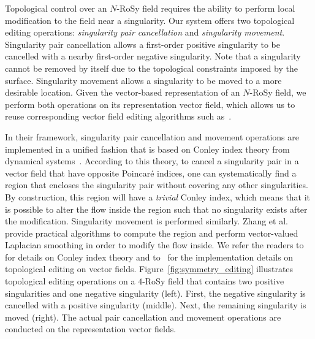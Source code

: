 \documentclass{acmsiggraph}               %
\begin{document}
%

Topological control over an $N$-RoSy field requires the ability to
perform local modification to the field near a singularity. Our
system offers two topological editing operations: {\em singularity
pair cancellation} and {\em singularity movement}. Singularity pair
cancellation allows a first-order positive singularity to be
cancelled with a nearby first-order negative singularity. Note that
a singularity cannot be removed by itself due to the topological
constraints imposed by the surface. Singularity movement allows a
singularity to be moved to a more desirable location. Given the
vector-based representation of an $N$-RoSy field, we perform both
operations on its representation vector field, which allows us to
reuse corresponding vector field editing algorithms such
as~\cite{Zhang:06}.

In their framework, singularity pair cancellation and movement
operations are implemented in a unified fashion that is based on
Conley index theory from dynamical systems~\cite{Mischaikow:02}.
According to this theory, to cancel a singularity pair in a vector
field that have opposite Poincar\'e indices, one can systematically
find a region that encloses the singularity pair without covering
any other singularities. By construction, this region will have a
{\em trivial} Conley index, which means that it is possible to alter
the flow inside the region such that no singularity exists after the
modification. Singularity movement is performed similarly. Zhang et
al.~ provide practical algorithms to compute the
region and perform vector-valued Laplacian smoothing in order to
modify the flow inside. We refer the readers to~\cite{Mischaikow:02}
for details on Conley index theory and to~\cite{Zhang:06} for the
implementation details on topological editing on vector fields.
Figure~\ref{fig:symmetry_editing} illustrates topological editing
operations on a $4$-RoSy field that contains two positive
singularities and one negative singularity (left). First, the
negative singularity is cancelled with a positive singularity
(middle). Next, the remaining singularity is moved (right). The
actual pair cancellation and movement operations are conducted on
the representation vector fields.
\end{document}

